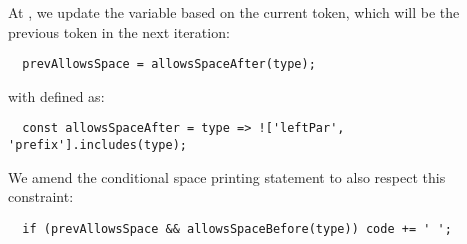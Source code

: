 At , we update the variable based on the current token,
which will be the previous token in the next iteration:
\begin{verbatim}
  prevAllowsSpace = allowsSpaceAfter(type);
\end{verbatim}
with  defined as:
\begin{verbatim}
  const allowsSpaceAfter = type => !['leftPar', 'prefix'].includes(type);
\end{verbatim}
We amend the conditional space printing statement
to also respect this constraint:
\begin{verbatim}
  if (prevAllowsSpace && allowsSpaceBefore(type)) code += ' ';
\end{verbatim}
